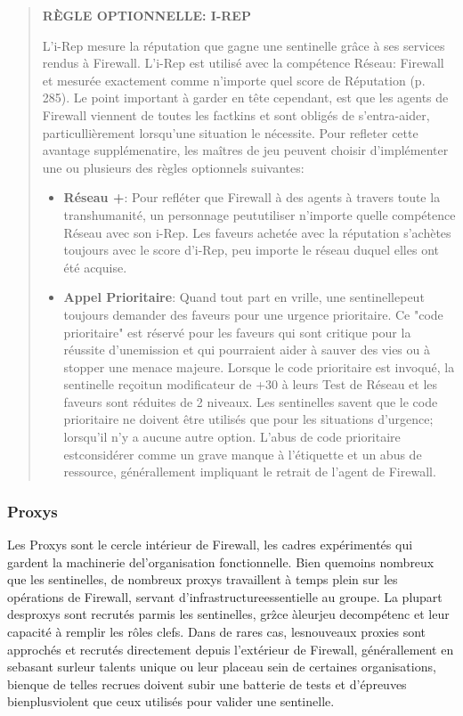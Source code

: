 \begin{quotation} \textbf{RÈGLE OPTIONNELLE: I-REP} 

L'i-Rep mesure la réputation que gagne une sentinelle grâce à ses services rendus à Firewall. L'i-Rep est utilisé avec la compétence Réseau: Firewall et mesurée exactement comme n'importe quel score de Réputation (p. 285). Le point important à garder en tête cependant, est que les agents de Firewall viennent de toutes les factkins et sont obligés de s'entra-aider, particullièrement lorsqu'une situation le nécessite. Pour refleter cette avantage supplémenatire, les maîtres de jeu peuvent choisir d'implémenter une ou plusieurs des règles optionnels suivantes: \begin{itemize} \item \textbf{Réseau +}: Pour refléter que Firewall à des agents à travers toute la transhumanité, un personnage peututiliser n'importe quelle compétence Réseau avec son i-Rep. Les faveurs achetée avec la réputation s'achètes toujours avec le score d'i-Rep, peu importe le réseau duquel elles ont été acquise. \item \textbf{Appel Prioritaire}: Quand tout part en vrille, une sentinellepeut toujours demander des faveurs pour une urgence prioritaire. Ce "code prioritaire" est réservé pour les faveurs qui sont critique pour la réussite d'unemission et qui pourraient aider à sauver des vies ou à stopper une menace majeure. Lorsque le code prioritaire est invoqué, la sentinelle reçoitun modificateur de +30 à leurs Test de Réseau et les faveurs sont réduites de 2 niveaux. Les sentinelles savent que le code prioritaire ne doivent être utilisés que pour les situations d'urgence; lorsqu'il n'y a aucune autre option. L'abus de code prioritaire estconsidérer comme un grave manque à l'étiquette et un abus de ressource, générallement impliquant le retrait de l'agent de Firewall. \end{itemize} \end{quotation} 



\subsubsection{Proxys } 

Les Proxys sont le cercle intérieur de Firewall, les cadres expérimentés qui gardent la machinerie del'organisation fonctionnelle. Bien quemoins nombreux que les sentinelles, de nombreux proxys travaillent à temps plein sur les opérations de Firewall, servant d'infrastructureessentielle au groupe. La plupart desproxys sont recrutés parmis les sentinelles, grẑce àleurjeu decompétenc et leur capacité à remplir les rôles clefs. Dans de rares cas, lesnouveaux proxies sont approchés et recrutés directement depuis l'extérieur de Firewall, générallement en sebasant surleur talents unique ou leur placeau sein de certaines organisations, bienque de telles recrues doivent subir une batterie de tests et d'épreuves bienplusviolent que ceux utilisés pour valider une sentinelle. 

